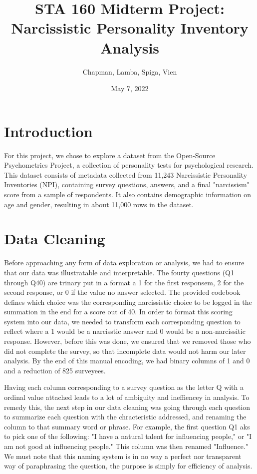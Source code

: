 \documentclass{article}
\title{STA 160 Midterm Project: Narcissistic Personality Inventory Analysis}
\author{Chapman, Lamba, Spiga, Vien}
\date{May 7, 2022}
\begin{document}
\maketitle
\tableofcontents
\pagebreak

\section{Introduction}
For this project, we chose to explore a dataset from the Open-Source Psychometrics Project, a collection of personality tests for psychological research. This dataset consists of metadata collected from 11,243 Narcissistic Personality Inventories (NPI), containing survey questions, answers, and a final "narcissism" score from a sample of respondents. It also contains demographic information on age and gender, resulting in about 11,000 rows in the dataset.

\section{Data Cleaning}
Before approaching any form of data exploration or analysis, we had to ensure that our data was illustratable and interpretable. The fourty questions (Q1 through Q40) are trinary put in a format a 1 for the first responsem, 2 for the second response, or 0 if the value no answer selected. The provided codebook defines which choice was the corresponding narcissistic choice to be logged in the summation in the end for a score out of 40. In order to format this scoring system into our data, we needed to transform each corresponding question to reflect where a 1 would be a narcisstic answer and 0 would be a non-narcissitic response. However, before this was done, we ensured that we removed those who did not complete the survey, so that incomplete data would not harm our later analysis. By the end of this manual encoding, we had binary columns of 1 and 0 and a reduction of 825 surveyees. 

Having each column corresponding to a survey question as the letter Q with a ordinal value attached leads to a lot of ambiguity and ineffiencey in analysis. To remedy this, the next step in our data cleaning was going through each question to summarize each question with the chracteristic addressed, and renaming the column to that summary word or phrase. For example, the first question Q1 aks to pick one of the following: "I have a natural talent for influencing people," or "I am not good at influencing people." This column was then renamed "Influence." We must note that this naming system is in no way a perfect nor transparent way of paraphrasing the question, the purpose is simply for efficiency of analysis. 
\end{document}
